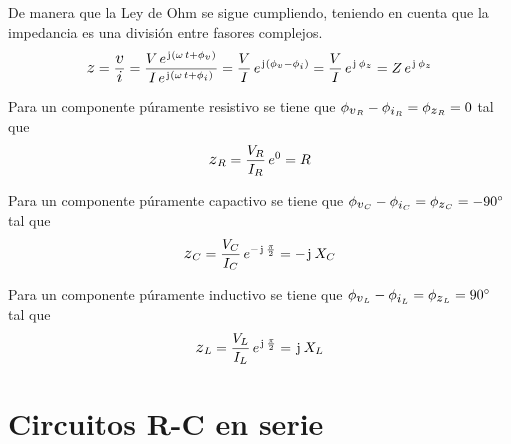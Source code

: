 De manera que la Ley de Ohm se sigue cumpliendo, teniendo en cuenta que la impedancia es una división entre fasores complejos.
\begin{equation*}
    \impedance = \frac{\voltage}{\current}
    = \frac{V \, e^{\iu \inParentheses{\omega \, t + \phi_\voltage}}}{I \, e^{\iu \inParentheses{\omega \, t + \phi_\current}}}
    = \frac{V}{I} \, e^{\iu \inParentheses{\phi_\voltage - \phi_\current}}
    = \frac{V}{I} \, e^{\iu \, \phi_\impedance}
    = Z \, e^{\iu \, \phi_\impedance}
\end{equation*}

\begin{mdframed}[style=PropertyFrame]
    \begin{prop}
    \end{prop}
    Para un componente púramente resistivo se tiene que $\phi_{\voltage_R} - \phi_{\current_R} = \phi_{\impedance_R} = 0$ tal que
    \begin{equation*}
        \impedance_R = \frac{V_R}{I_R} \, e^0 = R
    \end{equation*}
\end{mdframed}

\begin{mdframed}[style=PropertyFrame]
    \begin{prop}
    \end{prop}
    Para un componente púramente capactivo se tiene que $\phi_{\voltage_C} - \phi_{\current_C} = \phi_{\impedance_C} = - \ang{90}$ tal que
    \begin{equation*}
        \impedance_C = \frac{V_C}{I_C} \, e^{- \iu \, \frac{\pi}{2}} = - \iu \, X_C
    \end{equation*}
\end{mdframed}

\begin{mdframed}[style=PropertyFrame]
    \begin{prop}
    \end{prop}
    Para un componente púramente inductivo se tiene que $\phi_{\voltage_L} - \phi_{\current_L} = \phi_{\impedance_L} = \ang{90}$ tal que
    \begin{equation*}
        \impedance_L = \frac{V_L}{I_L} \, e^{\iu \, \frac{\pi}{2}} = \iu \, X_L
    \end{equation*}
\end{mdframed}


\section{Circuitos R-C en serie}

